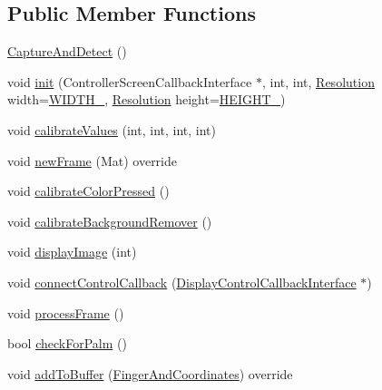 \subsection*{Public Member Functions}
\begin{DoxyCompactItemize}
\item 
\hyperlink{classCaptureAndDetect_a26c41eaa5100975ec0f50c97592f4bf1}{Capture\+And\+Detect} ()
\item 
void \hyperlink{classCaptureAndDetect_a485523d1c8231e2f744bf9d7fa110f88}{init} (Controller\+Screen\+Callback\+Interface $\ast$, int, int, \hyperlink{CaptureAndDetect_8h_a3c1fc1369ee351f25804c8cde5e85ac3}{Resolution} width=\hyperlink{CaptureAndDetect_8h_a3c1fc1369ee351f25804c8cde5e85ac3a278580710dc7c233b4035c222f100b9f}{W\+I\+D\+T\+H\+\_}, \hyperlink{CaptureAndDetect_8h_a3c1fc1369ee351f25804c8cde5e85ac3}{Resolution} height=\hyperlink{CaptureAndDetect_8h_a3c1fc1369ee351f25804c8cde5e85ac3aaf8940bab7f04c8cd702f61c4d051f27}{H\+E\+I\+G\+H\+T\+\_})
\item 
void \hyperlink{classCaptureAndDetect_aafb4f601f860dd38f514f6dd29a1d016}{calibrate\+Values} (int, int, int, int)
\item 
void \hyperlink{classCaptureAndDetect_a7f18d1c58b2ae4241766b36aa27385e9}{new\+Frame} (Mat) override
\item 
void \hyperlink{classCaptureAndDetect_ac60f9b1d192c043fa9b40c38fc5599e6}{calibrate\+Color\+Pressed} ()
\item 
void \hyperlink{classCaptureAndDetect_a53065abfb6eed6c074ad4d3370b3f232}{calibrate\+Background\+Remover} ()
\item 
void \hyperlink{classCaptureAndDetect_a3f1ba69514a2debbc6b2a03e76f31b65}{display\+Image} (int)
\item 
void \hyperlink{classCaptureAndDetect_aa75e3ba836797d18aa02c72bbf975082}{connect\+Control\+Callback} (\hyperlink{classDisplayControlCallbackInterface}{Display\+Control\+Callback\+Interface} $\ast$)
\item 
void \hyperlink{classCaptureAndDetect_ac7e70bbcade4e0023541c556ee7cb34e}{process\+Frame} ()
\item 
bool \hyperlink{classCaptureAndDetect_a1620075ba1bf4d52a4e455c20f7ac3d1}{check\+For\+Palm} ()
\item 
void \hyperlink{classCaptureAndDetect_af376ab5418f7b235ee181d574da71fd6}{add\+To\+Buffer} (\hyperlink{classFingerAndCoordinates}{Finger\+And\+Coordinates}) override
\end{DoxyCompactItemize}
